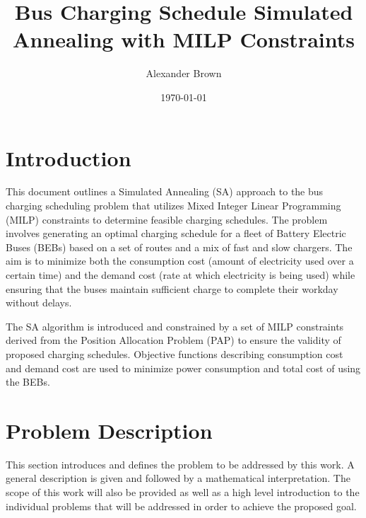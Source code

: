 \documentclass[11pt,a4paper,final]{article}
\author{Alexander Brown}
\date{\today}
\title{Bus Charging Schedule Simulated Annealing with MILP Constraints}
\begin{document}
\maketitle
\tableofcontents

\parskip 3mm                                %
\let\ref\autoref                            %

\section{Introduction}
\label{sec:introduction}
This document outlines a Simulated Annealing (SA) approach to the bus charging scheduling problem that utilizes Mixed
Integer Linear Programming (MILP) constraints to determine feasible charging schedules. The problem involves generating
an optimal charging schedule for a fleet of Battery Electric Buses (BEBs) based on a set of routes and a mix of fast and
slow chargers. The aim is to minimize both the consumption cost (amount of electricity used over a certain time) and the
demand cost (rate at which electricity is being used) while ensuring that the buses maintain sufficient charge to
complete their workday without delays.

The SA algorithm is introduced and constrained by a set of MILP constraints derived from the Position Allocation Problem
(PAP) to ensure the validity of proposed charging schedules. Objective functions describing consumption cost and demand
cost are used to minimize power consumption and total cost of using the BEBs.
\section{Problem Description}
\label{sec:problem-description}
This section introduces and defines the problem to be addressed by this work. A general description is given and
followed by a mathematical interpretation. The scope of this work will also be provided as well as a high level
introduction to the individual problems that will be addressed in order to achieve the proposed goal.
\end{document}

